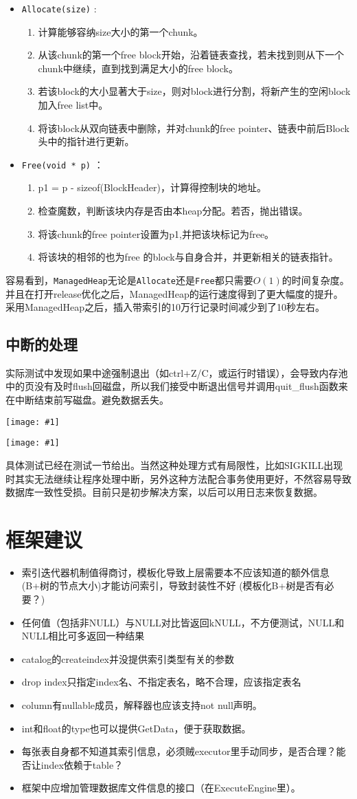 \documentclass[12pt, a4paper]{article}
\def\c#1{\texttt{#1}}
\def\s#1{\section{#1}}
\def\ss#1{\subsection{#1}}
\def\p{\par}
\def\g#1{\begin{center}\texttt{[image: \#1]}\end{center}}
\def\gm#1{\begin{center}\texttt{[image: \#1]}\end{center}}
\begin{document}
\begin{itemize}
  \item \c{Allocate(size)} : \begin{enumerate}
    \item 计算能够容纳size大小的第一个chunk。
    \item 从该chunk的第一个free block开始，沿着链表查找，若未找到则从下一个chunk中继续，直到找到满足大小的free block。
    \item 若该block的大小显著大于size，则对block进行分割，将新产生的空闲block加入free list中。
    \item 将该block从双向链表中删除，并对chunk的free pointer、链表中前后Block头中的指针进行更新。
  \end{enumerate}
  \item \c{Free(void * p)} ：\begin{enumerate}
    \item p1 = p - sizeof(BlockHeader)，计算得控制块的地址。
    \item 检查魔数，判断该块内存是否由本heap分配。若否，抛出错误。
    \item 将该chunk的free pointer设置为p1,并把该块标记为free。
    \item 将该块的相邻的也为free 的block与自身合并，并更新相关的链表指针。
  \end{enumerate}
\end{itemize}
\p 容易看到，\c{ManagedHeap}无论是\c{Allocate}还是\c{Free}都只需要$O(1)$的时间复杂度。并且在打开release优化之后，ManagedHeap的运行速度得到了更大幅度的提升。采用ManagedHeap之后，插入带索引的10万行记录时间减少到了10秒左右。
\ss{中断的处理}
\p 实际测试中发现如果中途强制退出（如ctrl+Z/C，或运行时错误），会导致内存池中的页没有及时flush回磁盘，所以我们接受中断退出信号并调用quit\_flush函数来在中断结束前写磁盘。避免数据丢失。
\g{imgs/sig_1.png}
\gm{imgs/sig_2.png}
\p 具体测试已经在测试一节给出。当然这种处理方式有局限性，比如SIGKILL出现时其实无法继续让程序处理中断，另外这种方法配合事务使用更好，不然容易导致数据库一致性受损。目前只是初步解决方案，以后可以用日志来恢复数据。
\s{框架建议}
\begin{itemize}
  \item 索引迭代器机制值得商讨，模板化导致上层需要本不应该知道的额外信息(B+树的节点大小)才能访问索引，导致封装性不好 (模板化B+树是否有必要？)
  \item 任何值（包括非NULL）与NULL对比皆返回kNULL，不方便测试，NULL和NULL相比可多返回一种结果
  \item catalog的createindex并没提供索引类型有关的参数
  \item drop index只指定index名、不指定表名，略不合理，应该指定表名
  \item column有nullable成员，解释器也应该支持not null声明。
  \item int和float的type也可以提供GetData，便于获取数据。
  \item 每张表自身都不知道其索引信息，必须贼executor里手动同步，是否合理？能否让index依赖于table？
  \item 框架中应增加管理数据库文件信息的接口（在ExecuteEngine里）。
\end{itemize}
\end{document}
